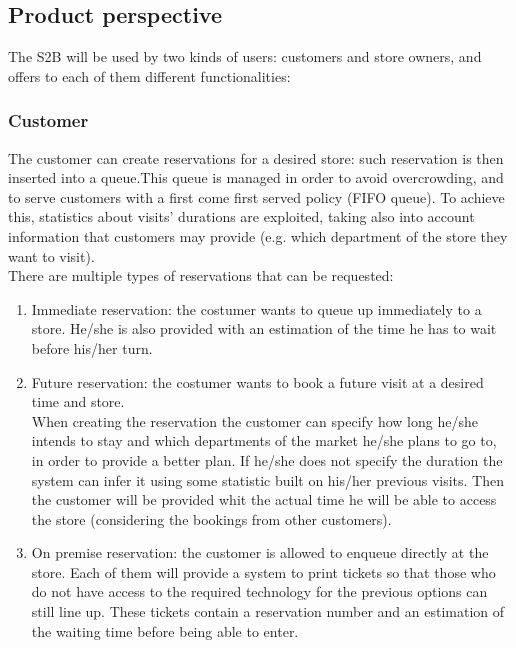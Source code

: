 \subsection{Product perspective}
The S2B will be used by two kinds of users: customers and store owners, and offers to each of them different functionalities:
\subsubsection{Customer}
The customer can create reservations for a desired store: such reservation is then inserted into a queue.This queue is managed in order to avoid overcrowding, and to serve customers with a first come first served policy (FIFO queue). To achieve this, statistics about visits' durations are exploited, taking also into account information that customers may provide (e.g. which department of the store they want to visit).\\
There are multiple types of reservations that can be requested:
\begin{enumerate}
	\item Immediate reservation: the costumer wants to queue up immediately to a store. He/she is also provided with an estimation of the time he has to wait before his/her turn.
	\item Future reservation: the costumer wants to book a future visit at a desired time and store.\\ When creating the reservation the customer can specify how long he/she intends to stay and which departments of the market he/she plans to go to, in order to provide a better plan. If he/she does not specify the duration the system can infer it using some statistic built on his/her previous visits. Then the customer will be provided whit the actual time he will be able to access the store (considering the bookings from other customers).
	\item On premise reservation: the customer is allowed to enqueue directly at the store. Each of them will provide a system to print tickets so that those who do not have access to the required technology for the previous options can still line up. These tickets contain a reservation number and an estimation of the waiting time before being able to enter.
\end{enumerate}
